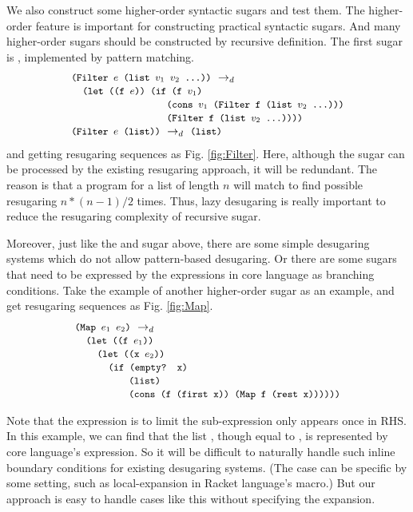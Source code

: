 We also construct some higher-order syntactic sugars and test them. The higher-order feature is important for constructing practical syntactic sugars. And many higher-order sugars should be constructed by recursive definition. The first sugar is , implemented by pattern matching.
\[\begin{array}{l}
\texttt{\small(Filter $e$ (list $v_1$ $v_2$ ...))} ~\rightarrow_d~\\
\quad
\texttt{\small (let ((f $e$)) (if (f $v_1$)}\\
\qquad\qquad\qquad\qquad\;\;\texttt{\small (cons $v_1$ (Filter f (list $v_2$ ...)))}\\
\qquad\qquad\qquad\qquad\;\;\texttt{\small (Filter f (list $v_2$ ...))))}\\

\texttt{\small(Filter $e$ (list))} ~\rightarrow_d~ \texttt{\small(list)}
\end{array}\]
and getting resugaring sequences as Fig.  \ref{fig:Filter}.
Here, although the sugar can be processed by the existing resugaring approach, it will be redundant. The reason is that a  program for a list of length $n$ will match to find possible resugaring $n*(n-1)/2$ times. Thus, lazy desugaring is really important to reduce the resugaring complexity of recursive sugar.

Moreover, just like the  and  sugar above, there are some simple desugaring systems which do not allow pattern-based desugaring. Or there are some sugars that need to be expressed by the expressions in core language as branching conditions. Take the example of another higher-order sugar  as an example, and get resugaring sequences as Fig.  \ref{fig:Map}.
\[
\begin{array}{l}
\texttt{\small(Map $e_1$ $e_2$)} ~\rightarrow_d~\\
\quad\texttt{\small (let ((f $e_1$))}\\
\qquad\texttt{\small(let ((x $e_2$))}\\
\qquad\quad

\texttt{\small(if (empty? x)}\\
\qquad\qquad\;\;\;\texttt{\small(list)}\\
\qquad\qquad\;\;\;\texttt{\small(cons (f (first x)) (Map f (rest x))))))}


\end{array}
\]



Note that the  expression is to limit the sub-expression only appears once in RHS. In this example, we can find that the list , though equal to , is represented by core language's expression. So it will be difficult to naturally handle such inline boundary conditions for existing desugaring systems. (The case can be specific by some setting, such as local-expansion\cite{10.1017/S0956796812000093} in Racket language's macro.) But our approach is easy to handle cases like this without specifying the expansion.

